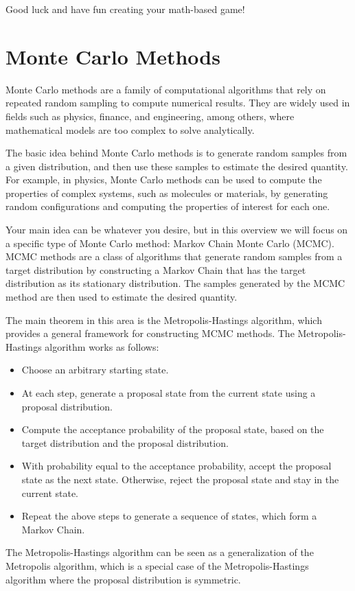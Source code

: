 \documentclass{article}
\begin{document}
    \vspace{3mm}
    Good luck and have fun creating your math-based game!
    

\pagebreak 


\section{Monte Carlo Methods}
    Monte Carlo methods are a family of computational algorithms that rely on repeated random sampling to compute numerical results. They are widely used in fields such as physics, finance, and engineering, among others, where mathematical models are too complex to solve analytically.
    
    
    \vspace{3mm}
    The basic idea behind Monte Carlo methods is to generate random samples from a given distribution, and then use these samples to estimate the desired quantity. For example, in physics, Monte Carlo methods can be used to compute the properties of complex systems, such as molecules or materials, by generating random configurations and computing the properties of interest for each one.
    
    \vspace{3mm}
    Your main idea can be whatever you desire, but in this overview we will focus on a specific type of Monte Carlo method: Markov Chain Monte Carlo (MCMC). MCMC methods are a class of algorithms that generate random samples from a target distribution by constructing a Markov Chain that has the target distribution as its stationary distribution. The samples generated by the MCMC method are then used to estimate the desired quantity.
    
    \vspace{3mm}
    The main theorem in this area is the Metropolis-Hastings algorithm, which provides a general framework for constructing MCMC methods. The Metropolis-Hastings algorithm works as follows:
    \begin{itemize}
        \item Choose an arbitrary starting state.
        \item At each step, generate a proposal state from the current state using a proposal distribution.
        \item Compute the acceptance probability of the proposal state, based on the target distribution and the proposal distribution.
        \item With probability equal to the acceptance probability, accept the proposal state as the next state. Otherwise, reject the proposal state and stay in the current state.
        \item Repeat the above steps to generate a sequence of states, which form a Markov Chain.
    \end{itemize}
    The Metropolis-Hastings algorithm can be seen as a generalization of the Metropolis algorithm, which is a special case of the Metropolis-Hastings algorithm where the proposal distribution is symmetric.
    
\end{document}
